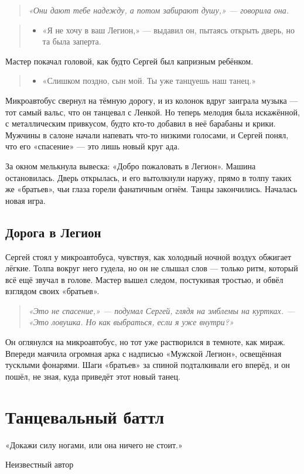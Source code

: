 \documentclass[12pt,a4paper]{book}
\newenvironment{dialogue}{\begin{quote}\itshape\begin{itemize}\item[]}{\end{itemize}\end{quote}}
\newenvironment{innerthought}{\begin{quote}\small\itshape}{\end{quote}}
\begin{document}
\begin{innerthought}
«Они дают тебе надежду, а потом забирают душу,» --- говорила она.
\end{innerthought}

\begin{dialogue}
«Я не хочу в ваш Легион,» --- выдавил он, пытаясь открыть дверь, но та была заперта. \\
\end{dialogue}

Мастер покачал головой, как будто Сергей был капризным ребёнком.

\begin{dialogue}
«Слишком поздно, сын мой. Ты уже танцуешь наш танец.»
\end{dialogue}

Микроавтобус свернул на тёмную дорогу, и из колонок вдруг заиграла музыка --- тот самый вальс, что он танцевал с Ленкой. Но теперь мелодия была искажённой, с металлическим привкусом, будто кто-то добавил в неё барабаны и крики. Мужчины в салоне начали напевать что-то низкими голосами, и Сергей понял, что его «спасение» --- это лишь новый круг ада.

За окном мелькнула вывеска: «Добро пожаловать в Легион». Машина остановилась. Дверь открылась, и его вытолкнули наружу, прямо в толпу таких же «братьев», чьи глаза горели фанатичным огнём. Танцы закончились. Началась новая игра.

\section{Дорога в Легион}

Сергей стоял у микроавтобуса, чувствуя, как холодный ночной воздух обжигает лёгкие. Толпа вокруг него гудела, но он не слышал слов --- только ритм, который всё ещё звучал в голове. Мастер вышел следом, постукивая тростью, и обвёл взглядом своих «братьев».

\begin{innerthought}
«Это не спасение,» --- подумал Сергей, глядя на эмблемы на куртках. --- «Это ловушка. Но как выбраться, если я уже внутри?»
\end{innerthought}

Он оглянулся на микроавтобус, но тот уже растворился в темноте, как мираж. Впереди маячила огромная арка с надписью «Мужской Легион», освещённая тусклыми фонарями. Шаги «братьев» за спиной подталкивали его вперёд, и он пошёл, не зная, куда приведёт этот новый танец.

\chapter{Танцевальный баттл}
\epigraph{«Докажи силу ногами, или она ничего не стоит.»}{Неизвестный автор}
\end{document}

